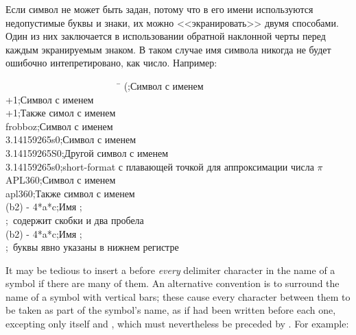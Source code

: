 Если символ не может быть задан, потому что в его имени используются
недопустимые буквы и знаки, их можно <<экранировать>> двумя способами. Один из
них заключается в использовании обратной наклонной черты перед каждым
экранируемым знаком. В таком случае имя символа никогда не будет ошибочно
интепретировано, как число.
Например:
\begin{lisp}
~~~~~~~~~~~~~~~~~~~~~~~~\=\kill
{\Xbackslash}(\>;\textrm{Символ с именем \cd{(}} \\
{\Xbackslash}+1\>;\textrm{Символ с именем } \\
+{\Xbackslash}1\>;\textrm{Также симол с именем } \\
{\Xbackslash}frobboz\>;\textrm{Символ с именем } \\
3.14159265{\Xbackslash}s0\>;\textrm{Символ с именем } \\
3.14159265{\Xbackslash}S0\>;\textrm{Другой символ с именем } \\
3.14159265s0\>;\textrm{short-format с плавающей точкой для аппроксимации числа $\pi$} \\
APL{\Xbackslash}{\Xbackslash}360\>;\textrm{Символ с именем } \\
apl{\Xbackslash}{\Xbackslash}360\>;\textrm{Также символ с именем } \\
{\Xbackslash}(b{\Xcircumflex}2{\Xbackslash}){\Xbackslash} -{\Xbackslash} 4*a*c\>;\textrm{Имя ;} \\
\>;~\textrm{содержит скобки и два пробела} \\
{\Xbackslash}({\Xbackslash}b{\Xcircumflex}2{\Xbackslash}){\Xbackslash} -{\Xbackslash} 4*{\Xbackslash}a*{\Xbackslash}c\>;\textrm{Имя ;} \\
\>;~\textrm{буквы явно указаны в нижнем регистре}
\end{lisp}
It may be tedious to insert a \cd{{\Xbackslash}} before \emph{every} delimiter
character in the name of a symbol if there are many of them.
An alternative convention is to surround the name of a symbol
with vertical bars; these cause every character between them to
be taken as part of the symbol's name, as if \cd{{\Xbackslash}} had been written
before each one, excepting only
\cd{|} itself and \cd{{\Xbackslash}}, which must nevertheless be preceded by \cd{{\Xbackslash}}.
For example:

